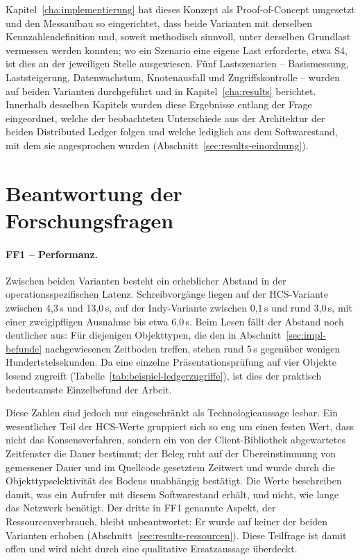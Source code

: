Kapitel~\ref{cha:implementierung} hat dieses Konzept als Proof-of-Concept umgesetzt und den Messaufbau so eingerichtet, dass beide Varianten mit derselben Kennzahlendefinition und, soweit methodisch sinnvoll, unter derselben Grundlast vermessen werden konnten; wo ein Szenario eine eigene Last erforderte, etwa S4, ist dies an der jeweiligen Stelle ausgewiesen. Fünf Lastszenarien -- Basismessung, Laststeigerung, Datenwachstum, Knotenausfall und Zugriffskontrolle -- wurden auf beiden Varianten durchgeführt und in Kapitel~\ref{cha:results} berichtet. Innerhalb desselben Kapitels wurden diese Ergebnisse entlang der Frage eingeordnet, welche der beobachteten Unterschiede aus der Architektur der beiden Distributed Ledger folgen und welche lediglich aus dem Softwarestand, mit dem sie angesprochen wurden (Abschnitt~\ref{sec:results-einordnung}).

\section{Beantwortung der Forschungsfragen}
\label{sec:conclusion-forschungsfragen}

\paragraph{FF1 -- Performanz.} Zwischen beiden Varianten besteht ein erheblicher Abstand in der operationsspezifischen Latenz. Schreibvorgänge liegen auf der HCS-Variante zwischen 4,3\,s und 13,0\,s, auf der Indy-Variante zwischen 0,1\,s und rund 3,0\,s, mit einer zweigipfligen Ausnahme bis etwa 6,0\,s. Beim Lesen fällt der Abstand noch deutlicher aus: Für diejenigen Objekttypen, die den in Abschnitt~\ref{sec:impl-befunde} nachgewiesenen Zeitboden treffen, stehen rund 5\,s gegenüber wenigen Hundertstelsekunden. Da eine einzelne Präsentationsprüfung auf vier Objekte lesend zugreift (Tabelle~\ref{tab:beispiel-ledgerzugriffe}), ist dies der praktisch bedeutsamste Einzelbefund der Arbeit.

Diese Zahlen sind jedoch nur eingeschränkt als Technologieaussage lesbar. Ein wesentlicher Teil der HCS-Werte gruppiert sich so eng um einen festen Wert, dass nicht das Konsensverfahren, sondern ein von der Client-Bibliothek abgewartetes Zeitfenster die Dauer bestimmt; der Beleg ruht auf der Übereinstimmung von gemessener Dauer und im Quellcode gesetztem Zeitwert und wurde durch die Objekttypselektivität des Bodens unabhängig bestätigt. Die Werte beschreiben damit, was ein Aufrufer mit diesem Softwarestand erhält, und nicht, wie lange das Netzwerk benötigt. Der dritte in FF1 genannte Aspekt, der Ressourcenverbrauch, bleibt unbeantwortet: Er wurde auf keiner der beiden Varianten erhoben (Abschnitt~\ref{sec:results-ressourcen}). Diese Teilfrage ist damit offen und wird nicht durch eine qualitative Ersatzaussage überdeckt.

